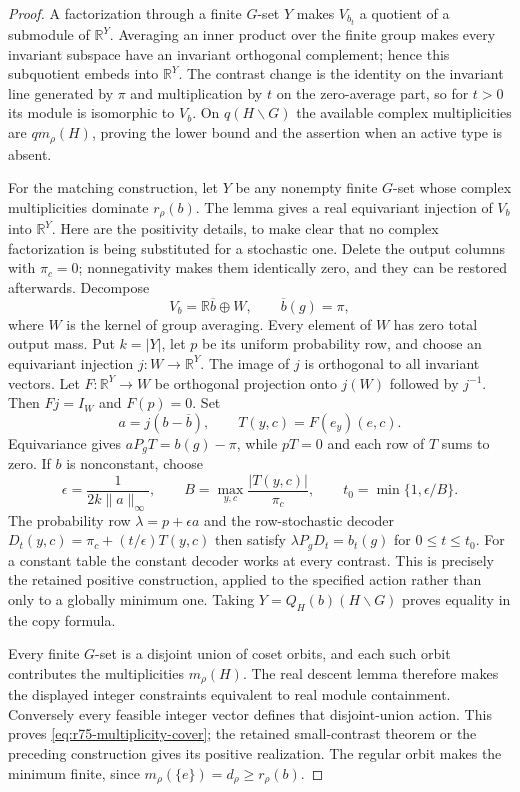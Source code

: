 \begin{proof}
A factorization through a finite $G$-set $Y$ makes $V_{b_t}$ a quotient
of a submodule of $\mathbb R^Y$. Averaging an inner product over the
finite group makes every invariant subspace have an invariant orthogonal
complement; hence this subquotient embeds into $\mathbb R^Y$. The
contrast change is the identity on the invariant line generated by
$\pi$ and multiplication by $t$ on the zero-average part, so for $t>0$
its module is isomorphic to $V_b$. On $q(H\backslash G)$ the available
complex multiplicities are $qm_\rho(H)$, proving the lower bound and
the assertion when an active type is absent.

For the matching construction, let $Y$ be any nonempty finite $G$-set
whose complex multiplicities dominate $r_\rho(b)$. The lemma gives a
real equivariant injection of $V_b$ into $\mathbb R^Y$. Here are the
positivity details, to make clear that no complex factorization is
being substituted for a stochastic one. Delete the output columns
with $\pi_c=0$; nonnegativity makes them identically zero, and they can
be restored afterwards. Decompose
\[
 V_b=\mathbb R\overline b\oplus W,\qquad
 \overline b(g)=\pi,
\]
where $W$ is the kernel of group averaging. Every element of $W$ has
zero total output mass. Put $k=|Y|$, let $p$ be its uniform probability
row, and choose an equivariant injection $j:W\to\mathbb R^Y$.
The image of $j$ is orthogonal to all invariant vectors. Let
$F:\mathbb R^Y\to W$ be orthogonal projection onto $j(W)$ followed by
$j^{-1}$. Then $Fj=I_W$ and $F(p)=0$. Set
\[
 a=j(b-\overline b),\qquad T(y,c)=F(e_y)(e,c).
\]
Equivariance gives $aP_gT=b(g)-\pi$, while $pT=0$ and each row of $T$
sums to zero. If $b$ is nonconstant, choose
\[
 \epsilon=\frac1{2k\|a\|_\infty},\qquad
 B=\max_{y,c}\frac{|T(y,c)|}{\pi_c},\qquad
 t_0=\min\{1,\epsilon/B\}.
\]
The probability row $\lambda=p+\epsilon a$ and the row-stochastic
decoder $D_t(y,c)=\pi_c+(t/\epsilon)T(y,c)$ then satisfy
$\lambda P_gD_t=b_t(g)$ for $0\le t\le t_0$. For a constant table the
constant decoder works at every contrast. This is precisely the
retained positive construction, applied to the specified action
rather than only to a globally minimum one. Taking
$Y=Q_H(b)(H\backslash G)$ proves equality in the copy formula.

Every finite $G$-set is a disjoint union of coset orbits, and each such
orbit contributes the multiplicities $m_\rho(H)$. The real descent
lemma therefore makes the displayed integer constraints equivalent to
real module containment. Conversely every feasible integer vector
defines that disjoint-union action. This proves
\eqref{eq:r75-multiplicity-cover}; the retained small-contrast theorem
or the preceding construction gives its positive realization. The
regular orbit makes the minimum finite, since
$m_\rho(\{e\})=d_\rho\ge r_\rho(b)$.
\end{proof}

